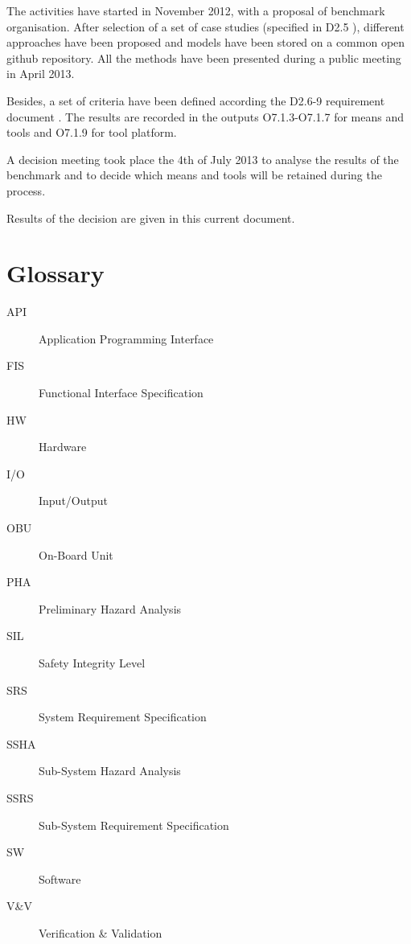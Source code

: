 The activities have started in November 2012, with a proposal of benchmark organisation.
After selection of a set of case studies (specified in D2.5 \citep{D2_5}), different approaches have been proposed and models have been stored on a common open github repository.
All the methods have been presented during a public meeting in April 2013.

Besides,  a set of criteria have been defined according the D2.6-9 requirement document \citep{D2_6}.  The results are recorded in the outputs O7.1.3-O7.1.7 \citep{WP7_O713_O717} for means and tools and O7.1.9 \citep{WP7_O719} for tool platform.

A decision meeting took place the 4th of July 2013 to analyse the results of the benchmark and to decide which means and tools will be retained during the process.

Results of the decision are given in this current document. 




\section{Glossary}
\label{sec:glossary}

\begin{description}
\item[API] Application Programming Interface
\item[FIS] Functional Interface Specification
\item[HW] Hardware
\item[I/O] Input/Output
\item[OBU] On-Board Unit
\item[PHA] Preliminary Hazard Analysis
\item[SIL] Safety Integrity Level
\item[SRS] System Requirement Specification
\item[SSHA] Sub-System Hazard Analysis
\item[SSRS] Sub-System Requirement Specification
\item[SW] Software
\item[V\&V] Verification \& Validation
\end{description}



